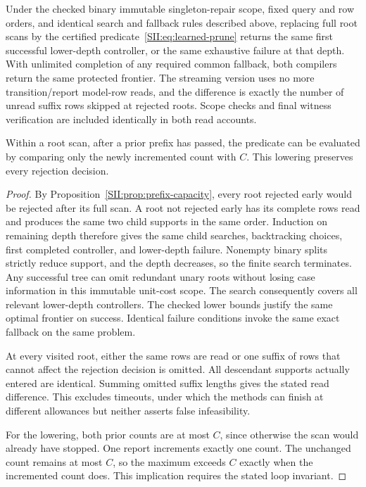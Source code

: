 \begin{SIItheorem}\label{SII:thm:streaming-pruning}
Under the checked binary immutable singleton-repair scope, fixed query and row orders, and identical search and fallback rules described above, replacing full root scans by the certified predicate~\eqref{SII:eq:learned-prune} returns the same first successful lower-depth controller, or the same exhaustive failure at that depth. With unlimited completion of any required common fallback, both compilers return the same protected frontier. The streaming version uses no more transition/report model-row reads, and the difference is exactly the number of unread suffix rows skipped at rejected roots. Scope checks and final witness verification are included identically in both read accounts.

Within a root scan, after a prior prefix has passed, the predicate can be evaluated by comparing only the newly incremented count with $C$. This lowering preserves every rejection decision.
\end{SIItheorem}
\begin{proof}
By Proposition~\ref{SII:prop:prefix-capacity}, every root rejected early would be rejected after its full scan. A root not rejected early has its complete rows read and produces the same two child supports in the same order. Induction on remaining depth therefore gives the same child searches, backtracking choices, first completed controller, and lower-depth failure. Nonempty binary splits strictly reduce support, and the depth decreases, so the finite search terminates. Any successful tree can omit redundant unary roots without losing case information in this immutable unit-cost scope. The search consequently covers all relevant lower-depth controllers. The checked lower bounds justify the same optimal frontier on success. Identical failure conditions invoke the same exact fallback on the same problem.

At every visited root, either the same rows are read or one suffix of rows that cannot affect the rejection decision is omitted. All descendant supports actually entered are identical. Summing omitted suffix lengths gives the stated read difference. This excludes timeouts, under which the methods can finish at different allowances but neither asserts false infeasibility.

For the lowering, both prior counts are at most $C$, since otherwise the scan would already have stopped. One report increments exactly one count. The unchanged count remains at most $C$, so the maximum exceeds $C$ exactly when the incremented count does. This implication requires the stated loop invariant.
\end{proof}

